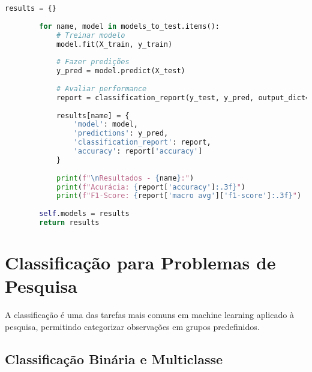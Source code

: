 \begin{researchbox}
\begin{lstlisting}[language=Python]
        results = {}
        
        for name, model in models_to_test.items():
            # Treinar modelo
            model.fit(X_train, y_train)
            
            # Fazer predições
            y_pred = model.predict(X_test)
            
            # Avaliar performance
            report = classification_report(y_test, y_pred, output_dict=True)
            
            results[name] = {
                'model': model,
                'predictions': y_pred,
                'classification_report': report,
                'accuracy': report['accuracy']
            }
            
            print(f"\nResultados - {name}:")
            print(f"Acurácia: {report['accuracy']:.3f}")
            print(f"F1-Score: {report['macro avg']['f1-score']:.3f}")
        
        self.models = results
        return results
\end{lstlisting}
\end{researchbox}

\section{Classificação para Problemas de Pesquisa}

A classificação é uma das tarefas mais comuns em machine learning aplicado à pesquisa, permitindo categorizar observações em grupos predefinidos.

\subsection{Classificação Binária e Multiclasse}

